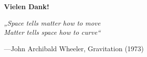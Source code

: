 \documentclass{beamer}
\begin{document}
    \begin{frame}{}

        \begin{center}
            \Huge\alert{\textbf{Vielen Dank!}}
        \end{center}

        \Large
        \textit{„Space tells matter how to move \\
        Matter tells space how to curve“}

        \normalsize
        ---John Archibald Wheeler, Gravitation (1973)
    \end{frame}
\end{document}
